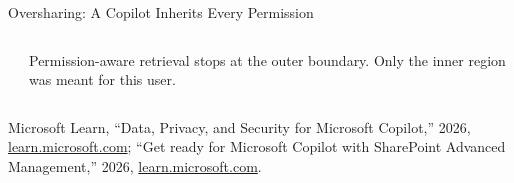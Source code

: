 \begin{frame}{Oversharing: A Copilot Inherits Every Permission}
\begin{columns}[T,onlytextwidth]
\begin{tikzpicture}[font=\sffamily\scriptsize, >=latex, scale=0.9, every node/.style={transform shape}]
      \end{tikzpicture}\\[0.3em]
      {\scriptsize Permission-aware retrieval stops at the outer boundary. Only the inner region was meant for this user.\par}
  \end{columns}
  \vspace{0.2em}
  {\scriptsize Microsoft Learn, ``Data, Privacy, and Security for Microsoft Copilot,'' 2026, \href{https://learn.microsoft.com/en-us/microsoft-365/copilot/microsoft-365-copilot-privacy}{learn.microsoft.com}; ``Get ready for Microsoft Copilot with SharePoint Advanced Management,'' 2026, \href{https://learn.microsoft.com/en-us/microsoft-365/copilot/get-ready-copilot-sharepoint-advanced-management}{learn.microsoft.com}.}
\end{frame}

